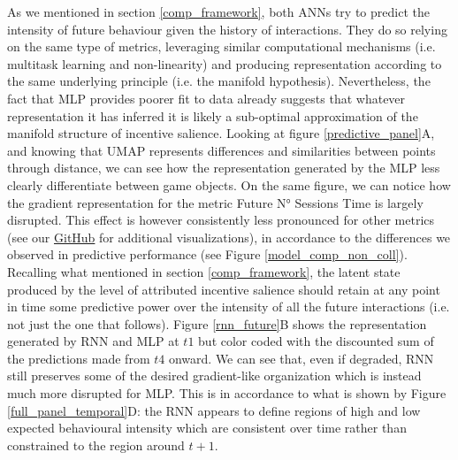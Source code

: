 As we mentioned in section \ref{comp_framework}, both ANNs try to predict the intensity of future behaviour given the history of interactions. They do so relying on the same type of metrics, leveraging similar computational mechanisms (i.e. multitask learning and non-linearity) and producing representation according to the same underlying principle (i.e. the manifold hypothesis). Nevertheless, the fact that MLP provides poorer fit to data already suggests that whatever representation it has inferred it is likely a sub-optimal approximation of the manifold structure of incentive salience. Looking at figure \ref{predictive_panel}A, and knowing that UMAP represents differences and similarities between points through distance, we can see how the representation generated by the MLP less clearly differentiate between game objects. On the same figure, we can notice how the gradient representation for the metric Future N° Sessions Time is largely disrupted. This effect is however consistently less pronounced for other metrics (see our \href{https://htmlpreview.github.io/?https://github.com/vb690/approx_incentive_salience/blob/main/notebooks_html/embedding_analysis.html}{GitHub} for additional visualizations), in accordance to the differences we observed in predictive performance (see Figure \ref{model_comp_non_coll}). Recalling what mentioned in section \ref{comp_framework}, the latent state produced by the level of attributed incentive salience should retain at any point in time some predictive power over the intensity of all the future interactions (i.e. not just the one that follows). Figure \ref{rnn_future}B shows the representation generated by RNN and MLP at $t1$ but color coded with the discounted sum of the predictions made from $t4$ onward. We can see that, even if degraded, RNN still preserves some of the desired gradient-like organization which is instead much more disrupted for MLP. This is in accordance to what is shown by Figure \ref{full_panel_temporal}D: the RNN appears to define regions of high and low expected behavioural intensity which are consistent over time rather than constrained to the region around $t+1$.
